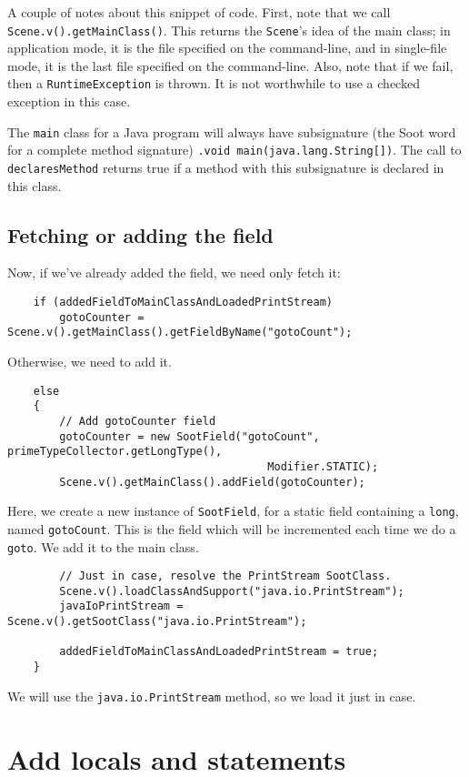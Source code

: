 \documentclass{article}
\begin{document}
A couple of notes about this snippet of code.  First, note that we
call {\tt Scene.v().getMainClass()}.  This returns the {\tt Scene}'s
idea of the main class; in application mode, it is the file specified
on the command-line, and in single-file mode, it is the last file
specified on the command-line.  Also, note that if we fail, then
a {\tt RuntimeException} is thrown.  It is not worthwhile to use a checked
exception in this case.

The {\tt main} class for a Java program will always have subsignature
(the Soot word for a complete method signature) {\tt .void
main(java.lang.String[])}. The call to {\tt declaresMethod} 
returns true if a method with this subsignature is declared in this
class.

\subsection{Fetching or adding the field}

Now, if we've already added the field, we need only fetch it:
\begin{verbatim}
    if (addedFieldToMainClassAndLoadedPrintStream)
        gotoCounter = Scene.v().getMainClass().getFieldByName("gotoCount");
\end{verbatim}

Otherwise, we need to add it.
\begin{verbatim}
    else
    {
        // Add gotoCounter field
        gotoCounter = new SootField("gotoCount", primeTypeCollector.getLongType(),
                                        Modifier.STATIC);
        Scene.v().getMainClass().addField(gotoCounter);
\end{verbatim}

Here, we create a new instance of {\tt SootField}, for a static field
containing a {\tt long}, named {\tt gotoCount}.  This is the field
which will be incremented each time we do a {\tt goto}.  We add it to
the main class.

\begin{verbatim}
        // Just in case, resolve the PrintStream SootClass.
        Scene.v().loadClassAndSupport("java.io.PrintStream");
        javaIoPrintStream = Scene.v().getSootClass("java.io.PrintStream");
    
        addedFieldToMainClassAndLoadedPrintStream = true;
    }
\end{verbatim}
We will use the {\tt java.io.PrintStream} method, so we load it just
in case.

\section{Add locals and statements}
\end{document}
